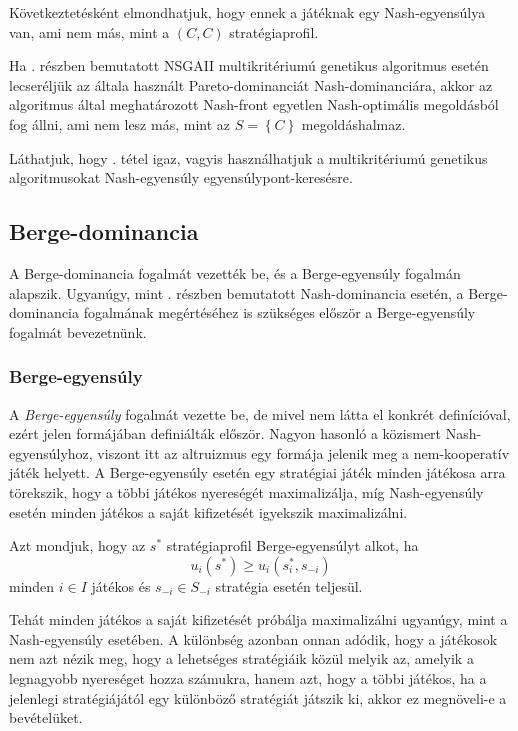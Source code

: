 \begin{pld}
  Következtetésként elmondhatjuk, hogy ennek a játéknak egy Nash-egyensúlya van, ami nem más, mint a $(C, C)$ stratégiaprofil.

  Ha . részben bemutatott NSGAII multikritériumú genetikus algoritmus esetén lecseréljük az általa használt Pareto-dominanciát Nash-dominanciára,
  akkor az algoritmus által meghatározott Nash-front egyetlen Nash-optimális megoldásból fog állni, ami nem lesz más, mint az $S = \left\{ C \right\}$ megoldáshalmaz.

  Láthatjuk, hogy . tétel igaz, vagyis használhatjuk a multikritériumú genetikus algoritmusokat Nash-egyensúly egyensúlypont-keresésre.
\end{pld}


\subsection{Berge-dominancia}
A Berge-dominancia fogalmát  vezették be, és a Berge-egyensúly fogalmán alapszik.
Ugyanúgy, mint . részben bemutatott Nash-dominancia esetén, a Berge-dominancia fogalmának megértéséhez is szükséges először a Berge-egyensúly fogalmát bevezetnünk.


\subsubsection{Berge-egyensúly}
A \emph{Berge-egyensúly} fogalmát  vezette be, de mivel nem látta el konkrét definícióval, ezért jelen formájában  definiálták először.
Nagyon hasonló a közismert Nash-egyensúlyhoz, viszont itt az altruizmus egy formája jelenik meg a nem-kooperatív játék helyett.
A Berge-egyensúly esetén egy stratégiai játék minden játékosa arra törekszik, hogy a többi játékos nyereségét maximalizálja, míg Nash-egyensúly esetén minden játékos a saját kifizetését igyekszik maximalizálni.

\begin{ert}
  Azt mondjuk, hogy az $s^*$ stratégiaprofil Berge-egyensúlyt alkot, ha
  \[
    u_i(s^*) \ge u_i(s^*_i, s_{-i})
  \]
  minden $i \in I$ játékos és $s_{-i} \in S_{-i}$ stratégia esetén teljesül.
\end{ert}

Tehát minden játékos a saját kifizetését próbálja maximalizálni ugyanúgy, mint a Nash-egyensúly esetében.
A különbség azonban onnan adódik, hogy a játékosok nem azt nézik meg, hogy a lehetséges stratégiáik közül melyik az, amelyik a legnagyobb nyereséget hozza számukra,
hanem azt, hogy a többi játékos, ha a jelenlegi stratégiájától egy különböző stratégiát játszik ki, akkor ez megnöveli-e a bevételüket.

